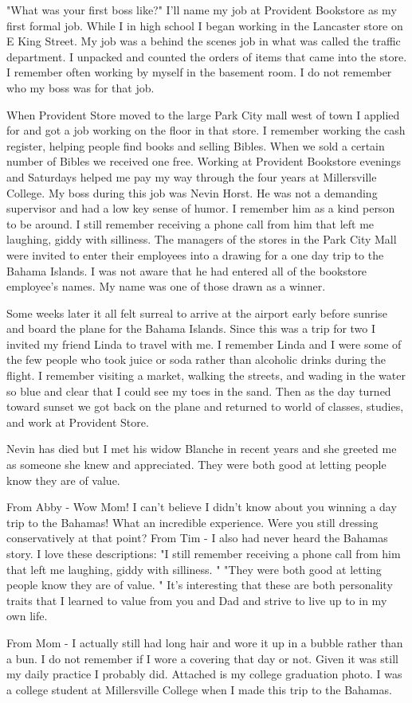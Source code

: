 "What was your first boss like?"
I'll name my job at Provident Bookstore as my first formal job.
While I in high school I began working in the Lancaster store on E King Street.
My job was a behind the scenes job in what was called the traffic department.
I unpacked and counted the orders of items that came into the store.
I remember often working by myself in the basement room.
I do not remember who my boss was for that job.

When Provident Store moved to the large Park City mall west of town I applied for and got a job working on the floor in that store.
I remember working the cash register, helping people find books and selling Bibles.
When we sold a certain number of Bibles we received one free.
Working at Provident Bookstore evenings and Saturdays helped me pay my way through the four years at Millersville College.
My boss during this job was Nevin Horst.
He was not a demanding supervisor and had a low key sense of humor.
I remember him as a kind person to be around.
I still remember receiving a phone call from him that left me laughing, giddy with silliness.
The managers of the stores in the Park City Mall were invited to enter their employees into a drawing for a one day trip to the Bahama Islands.
I was not aware that he had entered all of the bookstore employee's names.
My name was one of those drawn as a winner.

Some weeks later it all felt surreal to arrive at the airport early before sunrise and board the plane for the Bahama Islands.
Since this was a trip for two I invited my friend Linda to travel with me.
I remember Linda and I were some of the few people who took juice or soda rather than alcoholic drinks during the flight.
I remember visiting a market, walking the streets, and wading in the water so blue and clear that I could see my toes in the sand.
Then as the day turned toward sunset we got back on the plane and returned to world of classes, studies, and work at Provident Store.

Nevin has died but I met his widow Blanche in recent years and she greeted me as someone she knew and appreciated.
They were both good at letting people know they are of value.

From Abby - Wow Mom! I can't believe I didn't know about you winning a day trip to the Bahamas! What an incredible experience.
Were you still dressing conservatively at that point?
From Tim - I also had never heard the Bahamas story.
I love these descriptions:
"I still remember receiving a phone call from him that left me laughing, giddy with silliness.
"
"They were both good at letting people know they are of value.
"
It's interesting that these are both personality traits that I learned to value from you and Dad and strive to live up to in my own life.

From Mom - I actually still had long hair and wore it up in a bubble rather than a bun.
I do not remember if I wore a covering that day or not.
Given it was still my daily practice I probably did.
Attached is my college graduation photo.
I was a college student at Millersville College when I made this trip to the Bahamas.






